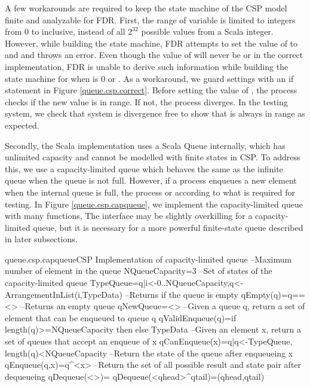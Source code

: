 \documentclass[a4paper, 12pt]{article}
\begin{document}
A few workarounds are required to keep the state machine of the CSP model finite and analyzable for FDR. First, the range of variable  is limited to integers from 0 to  inclusive, instead of all $2^{32}$ possible values from a Scala integer. However, while building the state machine, FDR attempts to set the value of  to  and  and throws an error. Even though the value of  will never be  or  in the correct implementation, FDR is unable to derive such information while building the state machine for  when  is 0 or . As a workaround, we guard  settings with an if statement in Figure \ref{queue.csp.correct}. Before setting the value of , the process checks if the new value is in range. If not, the process diverges. In the testing system, we check that system is divergence free to show that  is always in range as expected.

Secondly, the Scala implementation uses a Scala Queue internally, which has unlimited capacity and cannot be modelled with finite states in CSP. To address this, we use a capacity-limited queue which behaves the same as the infinite queue when the queue is not full. However, if a process enqueues a new element when the internal queue is full, the process  or  according to what is required for testing. In Figure \ref{queue.csp.capqueue}, we implement the capacity-limited queue with many functions, The interface may be slightly overkilling for a capacity-limited queue, but it is necessary for a more powerful finite-state queue described in later subsections. 

\begin{cspfloat}{queue.csp.capqueue}{CSP Implementation of capacity-limited queue}
--Maximum number of element in the queue
NQueueCapacity=3
--Set of states of the capacity-limited queue
TypeQueue={q|i<-{0..NQueueCapacity},q<-ArrangementInList(i,TypeData)}
--Returns if the queue is empty
qEmpty(q)=q==<>
--Returns an empty queue
qNewQueue=<>
--Given a queue q, return a set of element that can be enqueued to queue q
qValidEnqueue(q)=if length(q)>=NQueueCapacity then {} else TypeData
--Given an element x, return a set of queues that accept an enqueue of x
qCanEnqueue(x)={q|q<-TypeQueue, length(q)<NQueueCapacity}
--Return the state of the queue after enqueueing x
qEnqueue(q,x)=q^<x>
--Return the set of all possible result and state pair after dequeueing
qDequeue(<>)={}
qDequeue(<qhead>^qtail)={(qhead,qtail)}
\end{cspfloat}
\end{document}
